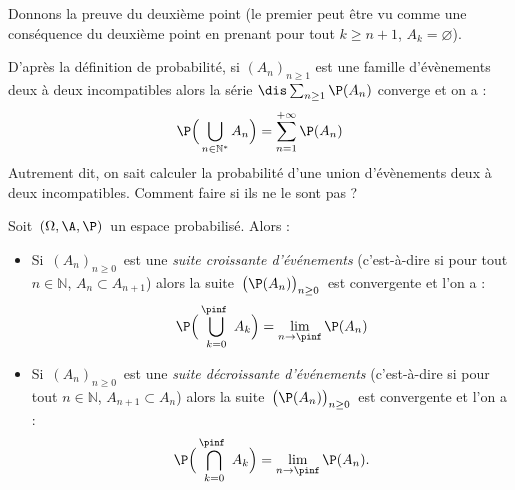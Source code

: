 \documentclass[a4paper,10pt]{report}
\begin{document}
\begin{preuve} Donnons la preuve du deuxième point (le premier peut être vu comme une conséquence du deuxième point en prenant pour tout $k \geq n+1$, $A_{k}= \varnothing$). 

\vspace{5cm}
%
\end{preuve}

\vspace{0.3cm}

\noindent D'après la définition de probabilité, si $(A_n)_{n \geq 1}$ est une famille d'évènements deux à deux incompatibles alors la série $\dis \sum_{n \geq 1} \P(A_n)$ converge et on a : 
\[ \P\Big(\bigcup\limits_{n\in \mathbb N^*} A_n\Big) = \sum_{n=1}^{+ \infty} \P (A_n) \]
Autrement dit, on sait calculer la probabilité d'une union d'évènements deux à deux incompatibles. Comment faire si ils ne le sont pas ?

%

\begin{thm}
Soit $\,(\Omega , \A , \P)\,$ un espace probabilisé. Alors :

\vspace{0.2cm}

\begin{itemize}
\item Si $\,(A_n)_{n \geq 0}\,$ est une \textit{suite croissante d'événements} 
(c'est-à-dire si pour tout $n \in \mathbb{N}$, $A_n\subset A_{n+1}$) alors la suite $\,\big(\P(A_n)\big)_{n \geq 0}\,$ est convergente et l'on a :
$$\P\Big(\bigcup_{k=0}^{\pinf\ }A_k\Big) =\lim_{n\to\pinf}\P(A_n)$$
\item  Si $\,(A_n)_{n \geq 0}\,$ est une \textit{suite décroissante d'événements}
(c'est-à-dire si pour tout $n \in \mathbb{N}$,  $A_{n+1}\subset A_n$) alors la suite $\,\big(\P(A_n)\big)_{n \geq 0}\,$ est convergente et l'on a :
$$\P\Big(\bigcap_{k=0}^{\pinf\ }A_k\Big) = \lim\limits_{n\to\pinf}\P(A_n).$$
\end{itemize}
\end{thm}
\end{document}
